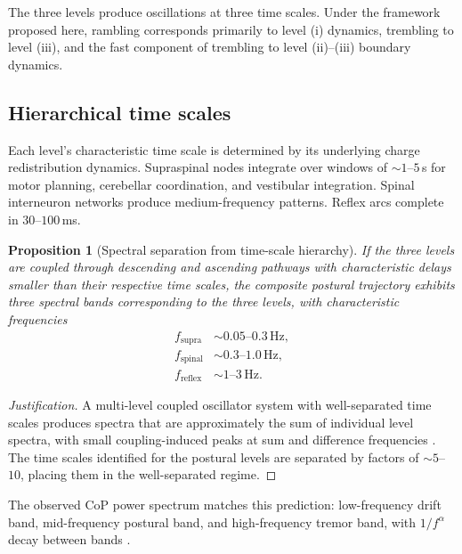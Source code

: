 \documentclass[11pt,twocolumn,a4paper]{article}
\newtheorem{proposition}[theorem]{Proposition}
\theoremstyle{definition}
\theoremstyle{remark}
\begin{document}
The three levels produce oscillations at three time scales. Under
the framework proposed here, rambling corresponds primarily to
level (i) dynamics, trembling to level (iii), and the fast
component of trembling to level (ii)--(iii) boundary dynamics.

\subsection{Hierarchical time scales}

Each level's characteristic time scale is determined by its
underlying charge redistribution dynamics. Supraspinal nodes
integrate over windows of $\sim 1$--$5$\,s for motor planning,
cerebellar coordination, and vestibular integration. Spinal
interneuron networks produce medium-frequency patterns.
Reflex arcs complete in $30$--$100$\,ms.

\begin{proposition}[Spectral separation from time-scale hierarchy]
If the three levels are coupled through descending and ascending
pathways with characteristic delays smaller than their respective
time scales, the composite postural trajectory exhibits three
spectral bands corresponding to the three levels, with
characteristic frequencies
\begin{align}
f_{\mathrm{supra}} &\sim 0.05\text{--}0.3\,\text{Hz}, \\
f_{\mathrm{spinal}} &\sim 0.3\text{--}1.0\,\text{Hz}, \\
f_{\mathrm{reflex}} &\sim 1\text{--}3\,\text{Hz}.
\end{align}
\end{proposition}

\begin{proof}[Justification]
A multi-level coupled oscillator system with well-separated time
scales produces spectra that are approximately the sum of individual
level spectra, with small coupling-induced peaks at sum and
difference frequencies \citep{winfree1980,kuramoto1984,strogatz2000}.
The time scales identified for the postural levels are separated by
factors of $\sim 5$--$10$, placing them in the well-separated
regime.
\end{proof}

The observed CoP power spectrum matches this prediction:
low-frequency drift band, mid-frequency postural band, and
high-frequency tremor band, with $1/f^{\alpha}$ decay between
bands \citep{duarte2008,collins1993,zatsiorsky2000}.
\end{document}
